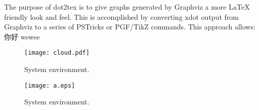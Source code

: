 \documentclass{article}
\begin{document}
\begin{CJK}{UTF8}{gbsn}
The purpose of dot2tex is to give graphs generated by Graphviz a more LaTeX friendly look and feel. This is accomplished by converting xdot output from Graphviz to a series of PSTricks or PGF/TikZ commands. This approach allows:你好 wewee

\begin{figure}[h]
    \centering
    \texttt{[image: cloud.pdf]}
    \caption{System environment.}
\end{figure}
\begin{figure}[ht]
    \centering
    \texttt{[image: a.eps]}
    \caption{System environment.}
\end{figure}
\end{CJK}
\end{document}
